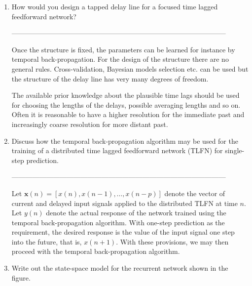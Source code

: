 \documentclass[10pt]{article}
\begin{document}
\begin{enumerate}
\vspace{2cm}
\item How would you design a tapped delay line for a focused time
  lagged feedforward network?


---------------------------------------------------------------------------------------------

Once the structure is fixed, the parameters can be learned for
  instance by temporal back-propagation.  For the design of the structure there are no
  general rules.  Cross-validation, Bayesian models selection etc.
  can be used but the structure of the delay line has very many
  degrees of freedom.

  The available prior knowledge about the plausible time lags should
  be used for choosing the lengths of the delays, possible averaging
  lengths and so on.  Often it is reasonable to have a higher
  resolution for the immediate past and increasingly coarse
  resolution for more distant past.



\vspace{2cm}
\item Discuss how the temporal back-propagation algorithm may be used for the
  training of a distributed time lagged feedforward network (TLFN) for single-step prediction.

---------------------------------------------------------------------------------------------

Let $\mathbf{x}(n)=[x(n), x(n-1), \ldots ,x(n-p)]$ denote the vector of current and
  delayed input signals applied to
  the distributed TLFN at time $n$. Let $y(n)$ denote the actual
  response of the network trained using the temporal back-propagation
  algorithm. With one-step prediction as the requirement, the desired
  response is the value of the input signal one step into the future,
  that is, $x(n+1)$. With these provisions, we may then
  proceed with the temporal back-propagation algorithm.




\vspace{2cm}
\item Write out the state-space model for the recurrent network shown in the
  figure.


\end{enumerate}
\end{document}
